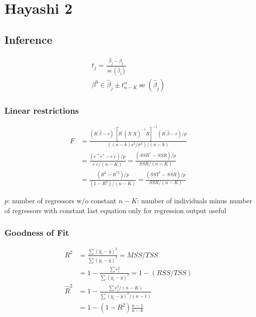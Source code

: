 \section{Hayashi 2}

\subsection{Inference}

\begin{align*}
    t_j = \frac{\widehat{\beta}_j-\beta_j}{\operatorname{se}\left(\widehat{\beta}_j\right)} \\
    \beta^0 \in \widehat{\beta}_j \pm t_{n-K}^\alpha \operatorname{se}\left(\widehat{\beta}_j\right)
\end{align*}

\subsubsection{Linear restrictions}

\begin{align*}
    F &= \frac{\left(R^{\prime} \widehat{\beta}-r\right)^{\prime}\left[R^{\prime}\left(X^{\prime} X\right)^{-1} R\right]^{-1}\left(R^{\prime} \widehat{\beta}-r\right) / p}{\left((n-k) s^2 / \sigma^2\right) /(n-k)} \\
    &= \frac{\left(e^{\prime *} e^*-e^{\prime} e\right) / p}{e^{\prime} e /(n-K)}=\frac{\left(S S R^*-S S R\right) / p}{S S R /(n-K)} \\
    &= \frac{\left(R^2-R^{* 2}\right) / p}{\left(1-R^2\right) /(n-K)} =\frac{\left(S S T^*-S S R\right) / p}{S S R /(n-K)}
\end{align*}

$p$: number of regressors w/o constant \newline
$n-K$: number of individuals minus number of regressors with constant
\newline
last equation only for regression output useful

\subsubsection{Goodness of Fit}

\begin{align*}
    R^2&=\frac{\sum\left(\widehat{y}_i-\bar{y}\right)^2}{\sum\left(y_i-\bar{y}\right)^2}=M S S / T S S \\
    &=1-\frac{\sum e_i^2}{\sum\left(y_i-\bar{y}\right)^2}=1-(R S S / T S S) \\
    \hat{R}^2&=1-\frac{\sum e_i^2 /(n-K)}{\sum\left(y_i-\bar{y}\right)^2 /(n-1)} \\
    & = 1-\left(1-R^2\right) \frac{n-1}{n-k}
\end{align*}

